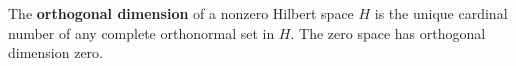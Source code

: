 The \textbf{orthogonal dimension} of a nonzero Hilbert space $H$ is the unique cardinal number of any complete orthonormal set in $H$. The zero space has orthogonal dimension zero.
